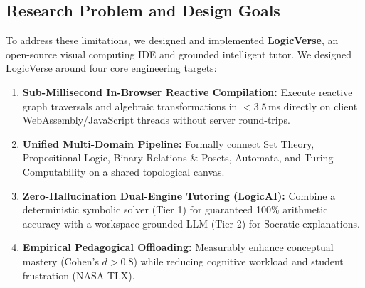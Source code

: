 \documentclass[conference]{IEEEtran}
\begin{document}
\subsection{Research Problem and Design Goals}
To address these limitations, we designed and implemented \textbf{LogicVerse}, an open-source visual computing IDE and grounded intelligent tutor. We designed LogicVerse around four core engineering targets:
\begin{enumerate}
    \item \textbf{Sub-Millisecond In-Browser Reactive Compilation:} Execute reactive graph traversals and algebraic transformations in $<3.5$\,ms directly on client WebAssembly/JavaScript threads without server round-trips.
    \item \textbf{Unified Multi-Domain Pipeline:} Formally connect Set Theory, Propositional Logic, Binary Relations \& Posets, Automata, and Turing Computability on a shared topological canvas.
    \item \textbf{Zero-Hallucination Dual-Engine Tutoring (LogicAI):} Combine a deterministic symbolic solver (Tier 1) for guaranteed 100\% arithmetic accuracy with a workspace-grounded LLM (Tier 2) for Socratic explanations.
    \item \textbf{Empirical Pedagogical Offloading:} Measurably enhance conceptual mastery (Cohen's $d > 0.8$) while reducing cognitive workload and student frustration (NASA-TLX).
\end{enumerate}

\begin{table}[htbp]
\caption{Capability Comparison of Instructional Platforms}
\label{tab:comparison}
\begin{center}
\end{center}
\end{table}
\end{document}
